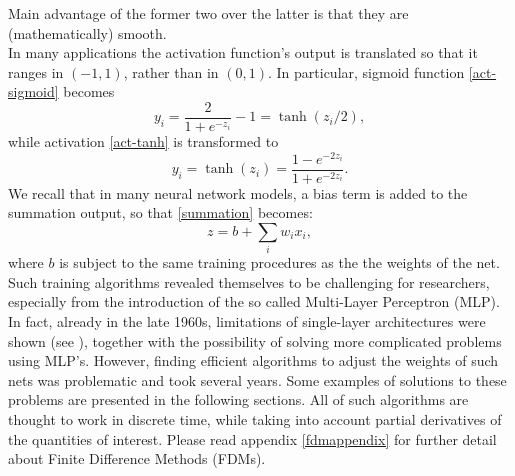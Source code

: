 \documentclass[%
    corpo=11pt,
    twoside,
    stile=classica,
    oldstyle,
    autoretitolo,
    tipotesi=magistrale,
    greek,
    evenboxes,
    english
]{toptesi}
\begin{document}
Main advantage of the former two over the latter is that they are (mathematically) smooth. \\
In many applications the activation function's output is translated so that it ranges in $\left(-1, 1\right)$, rather than in $\left(0, 1 \right)$. In particular, sigmoid function \eqref{act-sigmoid} becomes 
\begin{equation}
y_i = \frac{2}{1 + e^{-z_i}} -1 = \tanh(z_i/2),
\end{equation}
while activation \eqref{act-tanh} is transformed to 
\begin{equation}
y_i = \tanh(z_i) = \frac{1 - e^{-2z_i}}{1 + e^{-2z_i}}.
\end{equation}
We recall that in many neural network models, a bias term is added to the summation output, so that \eqref{summation} becomes:
\begin{equation}
z = b + \sum_{i}w_i x_i,
\end{equation}
where $b$ is subject to the same training procedures as the the weights of the net. \\ Such training algorithms revealed themselves to be challenging for researchers, especially from the introduction of the so called Multi-Layer Perceptron (MLP). In fact, already in the late 1960s, limitations of single-layer architectures were shown (see \cite{minpapert}), together with the possibility of solving more complicated problems using MLP's. However, finding efficient algorithms to adjust the weights of such nets was problematic and took several years. Some examples of solutions to these problems are presented in the following sections. All of such algorithms are thought to work in discrete time, while taking into account partial derivatives of the quantities of interest. Please read appendix \ref{fdmappendix} for further detail about Finite Difference Methods (FDMs).
\end{document}
